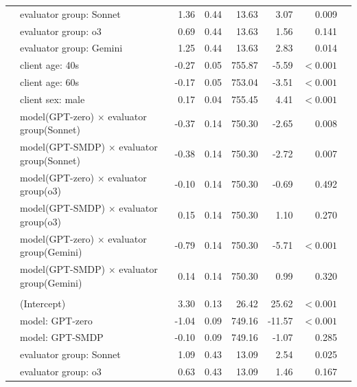 \documentclass{wiley-article}
\begin{document}
{\begin{longtable}{@{}l p{} rrrrrr@{}}
        & evaluator group: Sonnet                                 &  1.36 & 0.44 &  13.63 &   3.07 & 0.009 \\
        & evaluator group: o3                                     &  0.69 & 0.44 &  13.63 &   1.56 & 0.141 \\
        & evaluator group: Gemini                                 &  1.25 & 0.44 &  13.63 &   2.83 & 0.014 \\
        & client age: 40s                                         & -0.27 & 0.05 & 755.87 &  -5.59 & $<\!0.001$ \\
        & client age: 60s                                         & -0.17 & 0.05 & 753.04 &  -3.51 & $<\!0.001$ \\
        & client sex: male                                        &  0.17 & 0.04 & 755.45 &   4.41 & $<\!0.001$ \\
        & model(GPT-zero) $\times$ evaluator group(Sonnet)        & -0.37 & 0.14 & 750.30 &  -2.65 & 0.008 \\
        & model(GPT-SMDP) $\times$ evaluator group(Sonnet)        & -0.38 & 0.14 & 750.30 &  -2.72 & 0.007 \\
        & model(GPT-zero) $\times$ evaluator group(o3)            & -0.10 & 0.14 & 750.30 &  -0.69 & 0.492 \\
        & model(GPT-SMDP) $\times$ evaluator group(o3)            &  0.15 & 0.14 & 750.30 &   1.10 & 0.270 \\
        & model(GPT-zero) $\times$ evaluator group(Gemini)        & -0.79 & 0.14 & 750.30 &  -5.71 & $<\!0.001$ \\
        & model(GPT-SMDP) $\times$ evaluator group(Gemini)        &  0.14 & 0.14 & 750.30 &   0.99 & 0.320 \\
      \addlinespace
      \multicolumn{7}{l}{\textbf{EMP}}\\
        & (Intercept)                                             &  3.30 & 0.13 &  26.42 &  25.62 & $<\!0.001$ \\
        & model: GPT-zero                                         & -1.04 & 0.09 & 749.16 & -11.57 & $<\!0.001$ \\
        & model: GPT-SMDP                                         & -0.10 & 0.09 & 749.16 &  -1.07 & 0.285 \\
        & evaluator group: Sonnet                                 &  1.09 & 0.43 &  13.09 &   2.54 & 0.025 \\
        & evaluator group: o3                                     &  0.63 & 0.43 &  13.09 &   1.46 & 0.167 \\

\end{longtable}}
\end{document}
